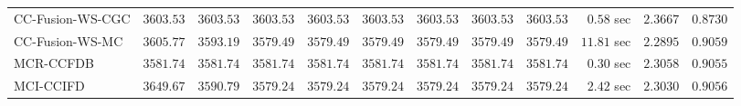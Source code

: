\begin{table}[H]
\begin{tabular}{lrrrrrrrrrrr}
    CC-Fusion-WS-CGC & $      3603.53$ & $      3603.53$ & $      3603.53$ & $      3603.53$ & $      3603.53$ & $      3603.53$ & $      3603.53$ & $      3603.53$ & $         0.58$ sec    & $       2.3667$  & $       0.8730$ \\ 
     CC-Fusion-WS-MC & $      3605.77$ & $      3593.19$ & $      3579.49$ & $      3579.49$ & $      3579.49$ & $      3579.49$ & $      3579.49$ & $      3579.49$ & $        11.81$ sec    & $       2.2895$  & $       0.9059$ \\ 
\cmidrule{1-1} 
           MCR-CCFDB & $      3581.74$ & $      3581.74$ & $      3581.74$ & $      3581.74$ & $      3581.74$ & $      3581.74$ & $      3581.74$ & $      3581.74$ & $         0.30$ sec    & $       2.3058$  & $       0.9055$ \\ 
\cmidrule{1-1} 
           MCI-CCIFD & $      3649.67$ & $      3590.79$ & $      3579.24$ & $      3579.24$ & $      3579.24$ & $      3579.24$ & $      3579.24$ & $      3579.24$ & $         2.42$ sec    & $       2.3030$  & $       0.9056$ \\ 
\bottomrule
\end{tabular}
\end{table}

